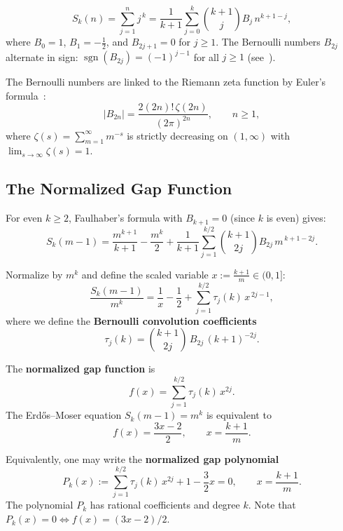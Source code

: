 \documentclass[12pt,a4paper]{article}
\theoremstyle{plain}
\theoremstyle{definition}
\begin{document}
\begin{equation}\label{eq:faulhaber}
  S_k(n) = \sum_{j=1}^{n} j^{\,k}
  = \frac{1}{k+1} \sum_{j=0}^{k} \binom{k+1}{j} B_j \, n^{k+1-j},
\end{equation}
where $B_0 = 1$, $B_1 = -\frac{1}{2}$, and $B_{2j+1} = 0$ for $j \ge 1$.
The Bernoulli numbers $B_{2j}$ alternate in sign:
$\operatorname{sgn}(B_{2j}) = (-1)^{j-1}$ for all $j \ge 1$
(see~\cite{Euler,IrelandRosen}).

The Bernoulli numbers are linked to the Riemann zeta function by Euler's
formula~\cite{Euler}:
\begin{equation}\label{eq:euler-zeta}
  |B_{2n}| = \frac{2(2n)!\,\zeta(2n)}{(2\pi)^{2n}}, \qquad n \ge 1,
\end{equation}
where $\zeta(s) = \sum_{m=1}^{\infty} m^{-s}$ is strictly decreasing on
$(1,\infty)$ with $\lim_{s\to\infty}\zeta(s)=1$.

\subsection{The Normalized Gap Function}

For even $k \ge 2$, Faulhaber's formula with $B_{k+1} = 0$ (since $k$ is
even) gives:
\[
  S_k(m-1) = \frac{m^{k+1}}{k+1}
           - \frac{m^k}{2}
           + \frac{1}{k+1}\sum_{j=1}^{k/2}
             \binom{k+1}{2j} B_{2j} \, m^{\,k+1-2j}.
\]

Normalize by $m^k$ and define the scaled variable
$x := \frac{k+1}{m} \in (0, 1]$:
\[
  \frac{S_k(m-1)}{m^k}
  = \frac{1}{x} - \frac{1}{2}
  + \sum_{j=1}^{k/2} \tau_j(k) \, x^{\,2j-1},
\]
where we define the \textbf{Bernoulli convolution coefficients}
\begin{equation}\label{eq:tau-def}
  \tau_j(k) = \binom{k+1}{2j} \, B_{2j} \, (k+1)^{-2j}.
\end{equation}

The \textbf{normalized gap function} is
\begin{equation}\label{eq:f-def}
  f(x) = \sum_{j=1}^{k/2} \tau_j(k) \, x^{2j}.
\end{equation}
The Erd\H{o}s--Moser equation $S_k(m-1) = m^k$ is equivalent to
\begin{equation}\label{eq:gap-root}
  \boxed{f(x) = \frac{3x-2}{2}}, \qquad x = \frac{k+1}{m}.
\end{equation}

Equivalently, one may write the \textbf{normalized gap polynomial}
\begin{equation}\label{eq:pk-def}
  \boxed{P_k(x) := \sum_{j=1}^{k/2} \tau_j(k) \, x^{2j}
                 + 1 - \frac{3}{2}x = 0},
  \qquad x = \frac{k+1}{m}.
\end{equation}
The polynomial $P_k$ has rational coefficients and degree $k$.
Note that $P_k(x) = 0 \iff f(x) = (3x-2)/2$.
\end{document}
